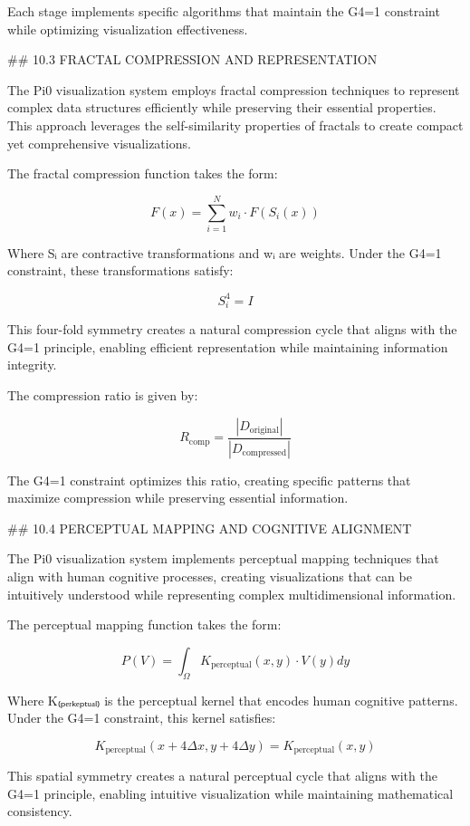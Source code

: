 Each stage implements specific algorithms that maintain the G4=1 constraint while optimizing visualization effectiveness.

## 10.3 FRACTAL COMPRESSION AND REPRESENTATION

The Pi0 visualization system employs fractal compression techniques to represent complex data structures efficiently while preserving their essential properties. This approach leverages the self-similarity properties of fractals to create compact yet comprehensive visualizations.

The fractal compression function takes the form:

$$F(x) = \sum_{i=1}^{N} w_i \cdot F(S_i(x))$$

Where Sᵢ are contractive transformations and wᵢ are weights. Under the G4=1 constraint, these transformations satisfy:

$$S_i^4 = I$$

This four-fold symmetry creates a natural compression cycle that aligns with the G4=1 principle, enabling efficient representation while maintaining information integrity.

The compression ratio is given by:

$$R_{\text{comp}} = \frac{|D_{\text{original}}|}{|D_{\text{compressed}}|}$$

The G4=1 constraint optimizes this ratio, creating specific patterns that maximize compression while preserving essential information.

## 10.4 PERCEPTUAL MAPPING AND COGNITIVE ALIGNMENT

The Pi0 visualization system implements perceptual mapping techniques that align with human cognitive processes, creating visualizations that can be intuitively understood while representing complex multidimensional information.

The perceptual mapping function takes the form:

$$P(V) = \int_{\Omega} K_{\text{perceptual}}(x, y) \cdot V(y) dy$$

Where K₍ₚₑᵣₖₑₚₜᵤₐₗ₎ is the perceptual kernel that encodes human cognitive patterns. Under the G4=1 constraint, this kernel satisfies:

$$K_{\text{perceptual}}(x+4\Delta x, y+4\Delta y) = K_{\text{perceptual}}(x, y)$$

This spatial symmetry creates a natural perceptual cycle that aligns with the G4=1 principle, enabling intuitive visualization while maintaining mathematical consistency.

